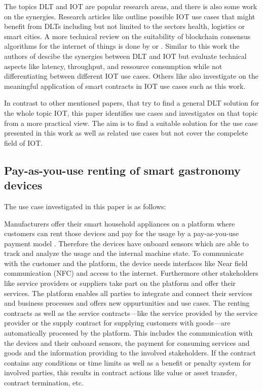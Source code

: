 \documentclass[conference]{IEEEtran}
\begin{document}
The topics DLT and IOT are popular research areas, and there is also some work on the synergies.
Research articles like \cite{Review2018} outline possible IOT use cases that might benefit from DLTs including but not limited to the sectors health, logistics or smart cities. A more technical review on the suitability of blockchain consensus algorithms for the internet of things is done by \cite{Salimitari2018ASO} or \cite{Eval2018}. Similar to this work the authors of \cite{convergence2019} descibe the synergies between DLT and IOT but evaluate technical aspects like latency, throughput, and ressource consumption while not differentiating between different IOT use cases. Others like \cite{SCIOT2016} also investigate on the meaningful application of smart contracts in IOT use cases such as this work.

In contrast to other mentioned papers, that try to find a general DLT solution for the whole topic IOT, this paper identifies use cases and investigates on that topic from a more practical view. The aim is to find a suitable solution for the use case presented in this work as well as related use cases but not cover the compelete field of IOT.


\subsection{Pay-as-you-use renting of smart gastronomy devices}
The use case investigated in this paper is as follows:

Manufacturers offer their smart household appliances on a platform where customers can rent those devices and pay for the usage by a pay-as-you-use payment model \cite{PayPerWash2020}. Therefore the devices have onboard sensors which are able to track and analyze the usage and the internal machine state. To communicate with the customer and the platform, the device needs interfaces like Near field communication (NFC) and access to the internet. Furthermore other stakeholders like service providers or suppliers take part on the platform and offer their services. The platform enables all parties to integrate and connect their services and business processes and offers new oppurtunities and use cases. The renting contracts as well as the service contracts---like the service provided by the service provider or the supply contract for supplying customers with goods---are automatically processed by the platform. This includes the communication with the devices and their onboard sensors, the payment for consuming services and goods and the information providing to the involved stakeholders. If the contract contains any conditions or time limits as well as a benefit or penalty system for involved parties, this results in contract actions like value or asset transfer, contract termination, etc.
\end{document}
